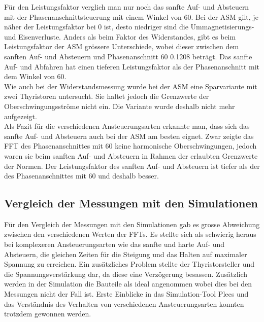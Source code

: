 Für den Leistungsfaktor verglich man nur noch das sanfte Auf- und Absteuern mit der Phasenanschnittsteuerung mit einem Winkel von 60\textdegree \hspace{0.02cm}. Bei der ASM gilt, je näher der Leistungsfaktor bei 0 ist, desto niedriger sind die Ummagnetisierungs- und Eisenverluste. Anders als beim Faktor des Widerstandes, gibt es beim Leistungsfaktor der ASM grössere Unterschiede, wobei dieser zwischen dem sanften Auf- und Absteuern und Phasenanschnitt 60\textdegree \hspace{0.02cm} 0.1208 beträgt. Das sanfte Auf- und Abfahren hat einen tieferen Leistungsfaktor als der Phasenanschnitt mit dem Winkel von 60\textdegree. \\

Wie auch bei der Widerstandsmessung wurde bei der ASM eine Sparvariante mit zwei Thyristoren untersucht. Sie haltet jedoch die Grenzwerte der Oberschwingungsströme nicht ein. Die Variante wurde deshalb nicht mehr aufgezeigt.\\

Als Fazit für die verschiedenen Ansteuerungsarten erkannte man, dass sich das sanfte Auf- und Absteuern auch bei der ASM am besten eignet. Zwar zeigte das FFT des Phasenanschnittes mit 60\textdegree \hspace{0.02cm} keine harmonische Oberschwingungen, jedoch waren sie beim sanften Auf- und Absteuern in Rahmen der erlaubten Grenzwerte der Normen. Der Leistungsfaktor des sanften Auf- und Absteuern ist tiefer als der des Phasenanschnittes mit 60\textdegree \hspace{0.02cm} und deshalb besser.

\subsection{Vergleich der Messungen mit den Simulationen}
Für den Vergleich der Messungen mit den Simulationen gab es grosse Abweichung zwischen den verschiedenen Werten der FFTs. Es stellte sich als schwierig heraus bei komplexeren Ansteuerungsarten wie das sanfte und harte Auf- und Absteuern, die gleichen Zeiten für die Steigung und das Halten auf maximaler Spannung zu erreichen. Ein zusätzliches Problem stellte der Thyristorsteller und die Spannungsverstärkung dar, da diese eine Verzögerung besassen. Zusätzlich werden in der Simulation die Bauteile als ideal angenommen wobei dies bei den Messungen nicht der Fall ist. Erste Einblicke in das Simulation-Tool Plecs und das Verständnis des Verhalten von verschiedenen Ansteuerungsarten konnten trotzdem gewonnen werden. 







